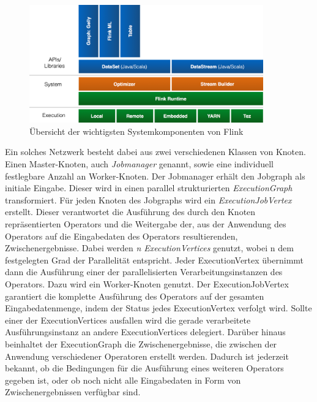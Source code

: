 \begin{figure}[h]
	\centering
	\includegraphics[width=0.9\textwidth]{picture/flink_stack_overview.png}
	\caption{Übersicht der wichtigsten Systemkomponenten von Flink}
\end{figure}

Ein solches Netzwerk besteht dabei aus zwei verschiedenen Klassen von Knoten. Einen Master-Knoten, auch \textit{Jobmanager} genannt, sowie eine individuell festlegbare Anzahl an Worker-Knoten. Der Jobmanager erhält den Jobgraph als initiale Eingabe. Dieser wird in einen parallel strukturierten \textit{ExecutionGraph} transformiert. Für jeden Knoten des Jobgraphs wird ein \textit{ExecutionJobVertex} erstellt. Dieser verantwortet die Ausführung des durch den Knoten repräsentierten Operators und die Weitergabe der, aus der Anwendung des Operators auf die Eingabedaten des Operators resultierenden, Zwischenergebnisse. Dabei werden \textit{n ExecutionVertices} genutzt, wobei n dem festgelegten Grad der Parallelität entspricht. Jeder ExecutionVertex übernimmt dann die Ausführung einer der parallelisierten Verarbeitungsinstanzen des Operators. Dazu wird ein Worker-Knoten genutzt. Der ExecutionJobVertex garantiert die komplette Ausführung des Operators auf der gesamten Eingabedatenmenge, indem der Status jedes ExecutionVertex verfolgt wird. Sollte einer der ExecutionVertices ausfallen wird die gerade verarbeitete Ausführungsinstanz an andere ExecutionVertices delegiert. Darüber hinaus beinhaltet der ExecutionGraph die Zwischenergebnisse, die zwischen der Anwendung verschiedener Operatoren erstellt werden. Dadurch ist jederzeit bekannt, ob die Bedingungen für die Ausführung eines weiteren Operators gegeben ist, oder ob noch nicht alle Eingabedaten in Form von Zwischenergebnissen verfügbar sind.

